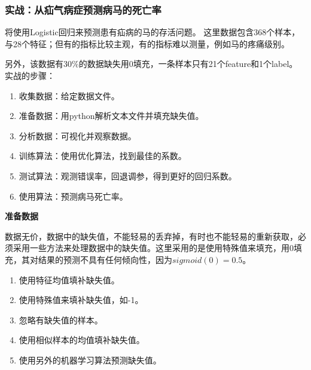 \subsubsection{实战：从疝气病症预测病马的死亡率}
将使用Logistic回归来预测患有疝病的马的存活问题。
这里数据包含368个样本，与28个特征；但有的指标比较主观，有的指标难以测量，例如马的疼痛级别。

另外，该数据有30\%的数据缺失用0填充，一条样本只有21个feature和1个label。\\
实战的步骤：
\begin{enumerate}
  \item 收集数据：给定数据文件。
  \item 准备数据：用python解析文本文件并填充缺失值。
  \item 分析数据：可视化并观察数据。
  \item 训练算法：使用优化算法，找到最佳的系数。
  \item 测试算法：观测错误率，回退调参，得到更好的回归系数。
  \item 使用算法：预测病马死亡率。
\end{enumerate}

\noindent\textbf{准备数据}\par
数据无价，数据中的缺失值，不能轻易的丢弃掉，有时也不能轻易的重新获取，必须采用一些方法来处理数据中的缺失值。这里采用的是使用特殊值来填充，用0填充，其对结果的预测不具有任何倾向性，因为$sigmoid(0)=0.5$。
\begin{enumerate}
  \item 使用特征均值填补缺失值。
  \item 使用特殊值来填补缺失值，如-1。
  \item 忽略有缺失值的样本。
  \item 使用相似样本的均值填补缺失值。
  \item 使用另外的机器学习算法预测缺失值。
\end{enumerate}

